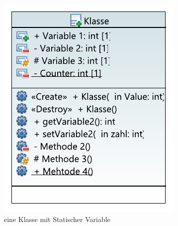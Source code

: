   \begin{figure}[H]
 	\centering
 	\includegraphics[scale=1.2]{bilder/pdfvorlagen/static}
 	\caption[eine Klasse mit Statischer Variable]{eine Klasse mit Statischer Variable}
 	\label{fig:klassestatic}
 \end{figure}
\cite{HelmutErlenkotter.}
\cite{Prof.Dr.AlfredIrber.}
\cite{Krau.}

